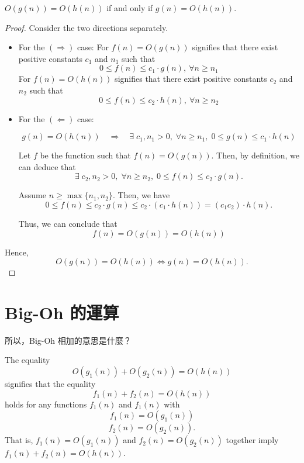 \begin{theorem}\label{thm:1.3.1}
    $O(g(n)) = O(h(n))$ if and only if $g(n) = O(h(n))$.
\end{theorem}
\begin{proof}
Consider the two directions separately.
\begin{itemize}
    \item For the $(\Rightarrow)$ case: 
    For $f(n) = O(g(n))$ signifies that there exist positive constants $c_1$ and $n_1$ such that
    \[
        0 \leq f(n) \leq c_1 \cdot g(n), \ \forall n \geq n_1
    \]
    For $f(n) = O(h(n))$ signifies that there exist positive constants $c_2$ and $n_2$ such that
    \[
        0 \leq f(n) \leq c_2 \cdot h(n), \ \forall n \geq n_2
    \]
    
    \item For the $(\Leftarrow)$ case: 
    \begin{prev}
        \[
        g(n) = O(h(n)) \quad \Rightarrow \quad \exists \; c_1, n_1 > 0, \; \forall n \geq n_1, \; 0 \leq g(n) \leq c_1 \cdot h(n)
        \]
    \end{prev}

    Let $f$ be the function such that $f(n) = O(g(n))$. Then, by definition, we can deduce that
    \[
        \exists \; c_2, n_2 > 0, \; \forall n \geq n_2, \; 0 \leq f(n) \leq c_2 \cdot g(n).
    \]

    Assume $n \geq \max\{n_1, n_2\}$. Then, we have
    \[
        0 \leq f(n) \leq c_2 \cdot g(n) \leq c_2 \cdot (c_1 \cdot h(n)) = (c_1 c_2) \cdot h(n).
    \]

    Thus, we can conclude that \[
        f(n) = O(g(n)) = O(h(n))
    \]
\end{itemize}
    Hence, \[
        O(g(n)) = O(h(n)) \iff g(n) = O(h(n)).
    \]
\end{proof}

\section{Big-Oh 的運算}

\begin{exercise}
    所以，Big-Oh 相加的意思是什麼？
\end{exercise}

\begin{definition}
    The equality $$O(g_1(n)) + O(g_2(n)) = O(h(n))$$ signifies that the equality
    \[
    f_1(n) + f_2(n) = O(h(n))
    \]
    holds for any functions $f_1(n)$ and $f_1(n)$ with
    \[
    f_1(n) = O(g_1(n))
    \]
    \[
    f_2(n) = O(g_2(n)).
    \]
    That is, $f_1(n) = O(g_1(n))$ and $f_2(n) = O(g_2(n))$ together imply $f_1(n) + f_2(n) = O(h(n))$.
\end{definition}
    


